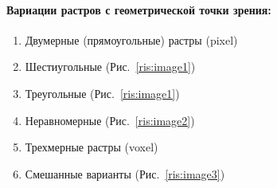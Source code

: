 \paragraph{Вариации растров с геометрической точки зрения:}
\begin{enumerate}
    \item Двумерные (прямоугольные) растры (pixel)
    \item Шестиугольные (Рис.~\ref{ris:image1})
    \item Треугольные (Рис.~\ref{ris:image1})
    \item Неравномерные (Рис.~\ref{ris:image2})
    \item Трехмерные растры (voxel)
    \item Смешанные варианты (Рис.~\ref{ris:image3})
\end{enumerate}

